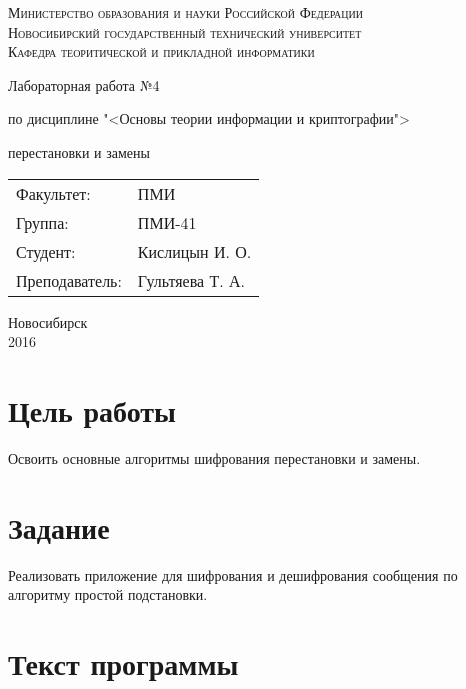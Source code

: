 \documentclass[oneside, final, 12pt]{extarticle}
\begin{document}
\begin{titlepage}
	\begin{centering}
		\textsc{Министерство образования и науки Российской Федерации}\\
		\textsc{Новосибирский государственный технический университет}\\
		\textsc{Кафедра теоритической и прикладной информатики}\\
	\end{centering}
	\vfill
	\vfill
	\vfill
	\Large
	\centerline{Лабораторная работа №4}
	\centerline{по дисциплине "<Основы теории информации и криптографии">}
	\centerline{ перестановки и замены}
	\normalsize
	\vfill
	\vfill
	\vfill
	\begin{flushleft}
		\begin{minipage}{0.3\textwidth}
			\begin{tabular}{l l}
				Факультет: & ПМИ\\
				Группа: & ПМИ-41\\
				Студент: & Кислицын И. О.\\
				Преподаватель: & Гультяева Т. А. 
			\end{tabular}
		\end{minipage}
	\end{flushleft}
	\vfill
	\vfill
	\begin{centering}
		Новосибирск\\
		2016\\
	\end{centering}
\end{titlepage}
\setcounter{page}{2}
\lstset{
	breaklines=\true,
	basicstyle=\footnotesize\ttfamily,
	tabsize=2,
	showspaces=\false,
	breaklines=\true,
	breakatwhitespace=\true,
	extendedchars=\true,
	keepspaces=\true,
	language=Haskell
}
\section{Цель работы}
Освоить основные алгоритмы шифрования перестановки и замены.

\section{Задание}
Реализовать приложение для шифрования и дешифрования сообщения по алгоритму простой подстановки.

\section{Текст программы}
\end{document}
